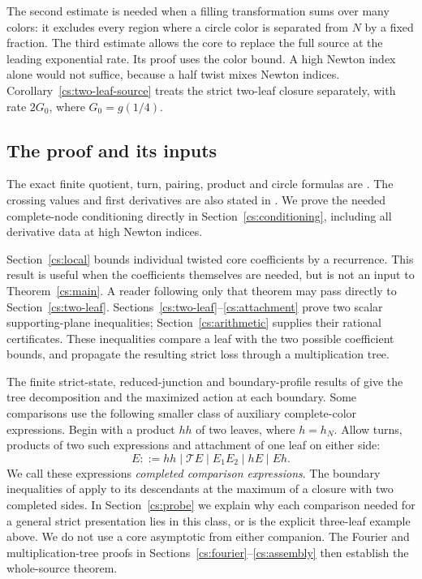 \documentclass[11pt]{article}
\theoremstyle{remark}\newtheorem{remark}[theorem]{Remark}
\numberwithin{equation}{section}
\newcommand{\Turn}{\mathcal T}
\begin{document}
The second estimate is needed when a filling transformation sums over
many colors: it excludes every region where a circle color is separated
from $N$ by a fixed fraction. The third estimate allows the core to
replace the full source at the leading exponential rate. Its proof
uses the color bound. A high Newton index alone would not suffice,
because a half twist mixes Newton indices.
Corollary~\ref{cs:two-leaf-source} treats the strict two-leaf closure
separately, with rate \(2G_0\), where \(G_0=g(1/4)\).

\subsection{The proof and its inputs}
The exact finite quotient, turn, pairing, product and circle formulas
are \cite[Proposition 3.2, Theorem 3.3 and Proposition 4.1]{Newton}.
The crossing values and first derivatives are also stated in
\cite[Proposition 5.1]{Finite}. We prove the needed complete-node
conditioning directly in Section~\ref{cs:conditioning}, including
all derivative data at high Newton indices.

Section~\ref{cs:local} bounds individual twisted core coefficients by a
recurrence. This result is useful when the coefficients themselves are
needed, but is not an input to Theorem~\ref{cs:main}. A reader following
only that theorem may pass directly to Section~\ref{cs:two-leaf}.
Sections~\ref{cs:two-leaf}--\ref{cs:attachment} prove two scalar
supporting-plane inequalities; Section~\ref{cs:arithmetic} supplies
their rational certificates. These inequalities compare a leaf with
the two possible coefficient bounds, and propagate the resulting strict
loss through a multiplication tree.

The finite strict-state, reduced-junction and boundary-profile
results of \cite{Newton} give the tree decomposition and the maximized
action at each boundary. Some comparisons use the following smaller
class of auxiliary complete-color expressions. Begin with a product
$hh$ of two leaves, where $h=h_N$. Allow turns, products of two such
expressions and attachment of one leaf on either side:
\[
 E::=hh\mid\Turn E\mid E_1E_2\mid hE\mid Eh.
\]
We call these expressions \emph{completed comparison expressions}.
The boundary inequalities of \cite[Lemma 9.5]{Newton} apply to its
descendants at the maximum of a closure with two completed sides. In Section~\ref{cs:probe} we explain why each comparison
needed for a general strict presentation lies in this class, or is
the explicit three-leaf example above. We do not use a core asymptotic
from either companion. The Fourier and multiplication-tree proofs
in Sections~\ref{cs:fourier}--\ref{cs:assembly} then establish the
whole-source theorem.
\end{document}
